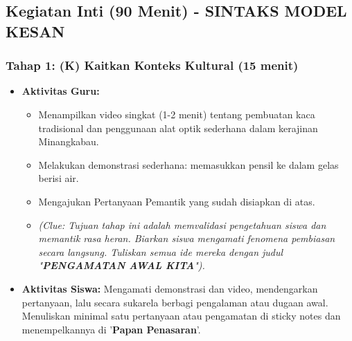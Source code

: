 \documentclass[12pt,a4paper]{article}
\begin{document}
\subsection{Kegiatan Inti (90 Menit) - SINTAKS MODEL KESAN}

\subsubsection{Tahap 1: (K) Kaitkan Konteks Kultural (15 menit)}
\begin{itemize}
\item \textbf{Aktivitas Guru:}
    \begin{itemize}
    \item Menampilkan video singkat (1-2 menit) tentang pembuatan kaca tradisional dan penggunaan alat optik sederhana dalam kerajinan Minangkabau.
    \item Melakukan demonstrasi sederhana: memasukkan pensil ke dalam gelas berisi air.
    \item Mengajukan Pertanyaan Pemantik yang sudah disiapkan di atas.
    \item \textit{(Clue: Tujuan tahap ini adalah memvalidasi pengetahuan siswa dan memantik rasa heran. Biarkan siswa mengamati fenomena pembiasan secara langsung. Tuliskan semua ide mereka dengan judul "\textbf{PENGAMATAN AWAL KITA}").}
    \end{itemize}
\item \textbf{Aktivitas Siswa:} Mengamati demonstrasi dan video, mendengarkan pertanyaan, lalu secara sukarela berbagi pengalaman atau dugaan awal. Menuliskan minimal satu pertanyaan atau pengamatan di sticky notes dan menempelkannya di '\textbf{Papan Penasaran}'.
\end{itemize}
\end{document}
